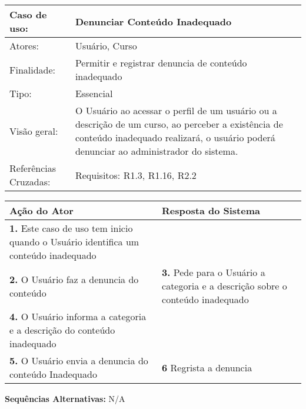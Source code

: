 \documentclass[12pt,a4paper,onecolumn,titlepage]{article}
\begin{document}
\begin{table}[h!]
\begin{center}
\begin{tabular}{p{2.5cm} p{9.5cm}}
Caso de uso: & \textbf{Denunciar Conteúdo Inadequado} \\ \hline
Atores: & Usuário, Curso \\ \hline
Finalidade: & Permitir e registrar denuncia de conteúdo inadequado\\ \hline
Tipo: & Essencial \\ \hline
Visão geral: & O Usuário ao acessar o perfil de um usuário ou a descrição de um curso, ao perceber a existência de conteúdo inadequado realizará, o usuário poderá denunciar ao administrador do sistema. \\ \hline
Referências Cruzadas: & Requisitos: R1.3, R1.16, R2.2\\

\end{tabular}
\end{center}
\end{table} 


\begin{center}
\def\arraystretch{1.1}
\begin{tabular}{|p{6cm}|p{6cm}|}

\hline
\textbf{Ação do Ator} & \textbf{Resposta do Sistema} \\ \hline
\textbf{1.} Este caso de uso tem inicio quando o Usuário identifica um conteúdo inadequado & \\ \hline
\textbf{2.} O Usuário faz a denuncia do conteúdo  & \textbf{3.} Pede para o Usuário a categoria e a descrição sobre o conteúdo inadequado  \\ \hline
\textbf{4.} O Usuário informa a categoria e a descrição do conteúdo inadequado & \\ \hline
\textbf{5.} O Usuário envia a denuncia do conteúdo Inadequado & \textbf{6} Regrista a denuncia \\ \hline
\end{tabular}
\end{center}

\textbf{Sequências Alternativas:} N/A

\newpage
\end{document}
